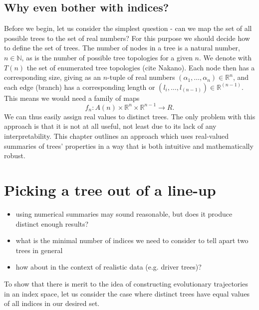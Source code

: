 \subsection{Why even bother with indices?}
Before we begin, let us consider the simplest question - can we map the set of all possible trees to the set of real numbers? For this purpose we should decide how to define the set of trees. The number of nodes in a tree is a natural number, $n\in\mathbb{N}$, as is the number of possible tree topologies for a given $n$. We denote with $T(n)$ the set of enumerated tree topologies (cite Nakano). Each node then has a corresponding size, giving as an $n$-tuple of real numbers $(\alpha_1, \dots, \alpha_n)\in\mathbb{R}^n$, and each edge (branch) has a corresponding length or $(l_i, \dots, l_{(n-1)})\in\mathbb{R}^{(n-1)}$. This means we would need a family of maps 
\begin{equation}
    f_n: A(n) \times \mathbb{R}^n \times \mathbb{R}^{n-1} \rightarrow R.
\end{equation}
We can thus easily assign real values to distinct trees. The only problem with this approach is that it is not at all useful, not least due to its lack of any interpretability. This chapter outlines an approach which uses real-valued summaries of trees' properties in a way that is both intuitive and mathematically robust. 

\section{Picking a tree out of a line-up}
\begin{itemize}
    \item using numerical summaries may sound reasonable, but does it produce distinct enough results?
    \item what is the minimal number of indices we need to consider to tell apart two trees in general
    \item how about in the context of realistic data (e.g. driver trees)?
\end{itemize}
To show that there is merit to the idea of constructing evolutionary trajectories in an index space, let us consider the case where distinct trees have equal values of all indices in our desired set. 
